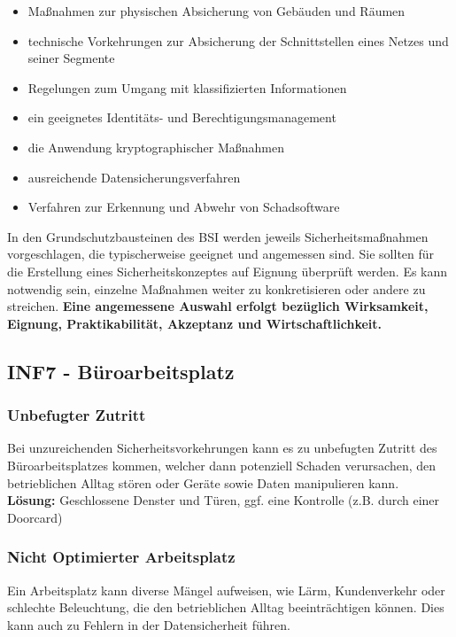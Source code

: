 \documentclass[a4paper, 12pt]{report}
\begin{document}
\begin{multicols}{2}
\begin{itemize}
	\item Maßnahmen zur physischen Absicherung von Gebäuden und Räumen
	\item technische Vorkehrungen zur Absicherung der Schnittstellen eines
		Netzes und seiner Segmente
	\item Regelungen zum Umgang mit klassifizierten Informationen
	\item ein geeignetes Identitäts- und Berechtigungsmanagement
	\item die Anwendung kryptographischer Maßnahmen
	\item ausreichende Datensicherungsverfahren
	\item Verfahren zur Erkennung und Abwehr von Schadsoftware
\end{itemize}

In den Grundschutzbausteinen des BSI werden jeweils Sicherheitsmaßnahmen 
vorgeschlagen, die typischerweise geeignet und angemessen sind. Sie sollten für 
die Erstellung eines Sicherheitskonzeptes auf Eignung überprüft werden. Es kann 
notwendig sein, einzelne Maßnahmen weiter zu konkretisieren oder andere zu 
streichen. \textbf{Eine angemessene Auswahl erfolgt bezüglich Wirksamkeit, 
Eignung, Praktikabilität, Akzeptanz und Wirtschaftlichkeit.}

\subsection{INF7 - Büroarbeitsplatz}

\subsubsection{Unbefugter Zutritt}

Bei unzureichenden Sicherheitsvorkehrungen kann es zu unbefugten Zutritt des 
Büroarbeitsplatzes kommen, welcher dann potenziell Schaden verursachen, den 
betrieblichen Alltag stören oder Geräte sowie Daten manipulieren kann. \\

\textbf{Lösung:} Geschlossene Denster und Türen, ggf. eine Kontrolle (z.B. durch 
einer Doorcard)

\subsubsection{Nicht Optimierter Arbeitsplatz}

Ein Arbeitsplatz kann diverse Mängel aufweisen, wie Lärm, Kundenverkehr oder
schlechte Beleuchtung, die den betrieblichen Alltag beeinträchtigen können. Dies
kann auch zu Fehlern in der Datensicherheit führen. \\


\end{multicols}
\end{document}
